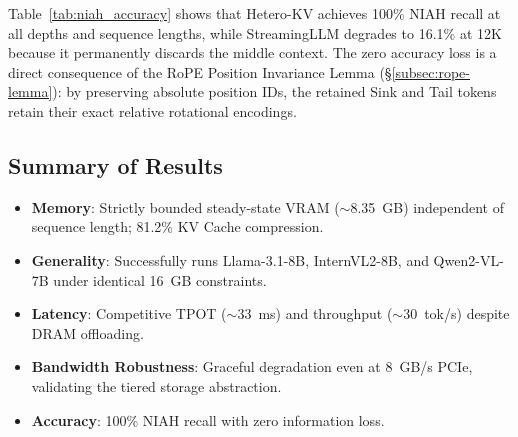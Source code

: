 Table~\ref{tab:niah_accuracy} shows that Hetero-KV achieves 100\% NIAH recall at all depths and sequence lengths, while StreamingLLM degrades to 16.1\% at 12K because it permanently discards the middle context. The zero accuracy loss is a direct consequence of the RoPE Position Invariance Lemma (\S\ref{subsec:rope-lemma}): by preserving absolute position IDs, the retained Sink and Tail tokens retain their exact relative rotational encodings.

\subsection{Summary of Results}

\begin{itemize}
    \item \textbf{Memory}: Strictly bounded steady-state VRAM ($\sim$8.35~GB) independent of sequence length; 81.2\% KV Cache compression.
    \item \textbf{Generality}: Successfully runs Llama-3.1-8B, InternVL2-8B, and Qwen2-VL-7B under identical 16~GB constraints.
    \item \textbf{Latency}: Competitive TPOT ($\sim$33~ms) and throughput ($\sim$30~tok/s) despite DRAM offloading.
    \item \textbf{Bandwidth Robustness}: Graceful degradation even at 8~GB/s PCIe, validating the tiered storage abstraction.
    \item \textbf{Accuracy}: 100\% NIAH recall with zero information loss.
\end{itemize}
